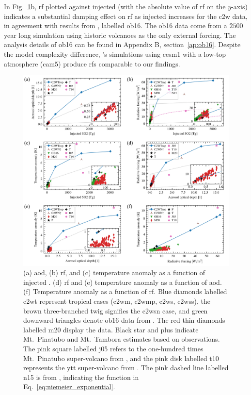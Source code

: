 \documentclass{ametsocV6.1}
\newcommand{\iso}[1][i]{{#1}njected \ce{SO2}}
\begin{document}
In Fig.~\ref{fig:4_parameter_scan}b, \gls{rf} plotted against \iso{} (with the absolute
value of \gls{rf} on the \(y\)-axis) indicates a substantial damping effect on \gls{rf}
as \iso{} increases for the \gls{c2w} data, in agreement with results from
\citet{ottobliesner2016}, labelled \gls{ob16}. The \gls{ob16} data come from a \(2500\)
year long simulation using historic volcanoes as the only external forcing. The analysis
details of \gls{ob16} can be found in Appendix B, section~\ref{ap:ob16}. Despite the
model complexity difference, \citet{ottobliesner2016}'s simulations using \gls{cesm1}
with a low-top atmosphere (\gls{cam5}) produce \glspl{rf} comparable to our findings.

\begin{figure}
  \centering
  \includegraphics[width=\linewidth]{figures/figure4.png}

  \caption{(a) \gls{aod}, (b) \gls{rf}, and (c) temperature anomaly as a function of
    \iso{}\@. (d) \gls{rf} and (e) temperature anomaly as a function of \gls{aod}. (f)
    Temperature anomaly as a function of \gls{rf}. Blue diamonds labelled \gls{c2wt}
    represent tropical cases (\gls{c2wm}, \gls{c2wmp}, \gls{c2ws}, \gls{c2wss}), the brown
    three-branched twig signifies the \gls{c2wsn} case, and green downward triangles denote
    \gls{ob16} data from \citet{ottobliesner2016}. The red thin diamonds labelled \gls{m20}
    display the \citet{marshall2020dataset} data. Black star and plus indicate Mt.\ Pinatubo
    and Mt.\ Tambora estimates based on observations. The pink square labelled \gls{j05}
    refers to the one-hundred times Mt.\ Pinatubo super-volcano from \citet{jones2005}, and
    the pink disk labelled \gls{t10} represents the \gls{ytt} super-volcano from
    \citet{timmreck2010}. The pink dashed line labelled \gls{n15} is from
    \citet{niemeier2015}, indicating the function in
    Eq.~\ref{eq:niemeier_exponential}.}\label{fig:4_parameter_scan}%
\end{figure}
\end{document}
